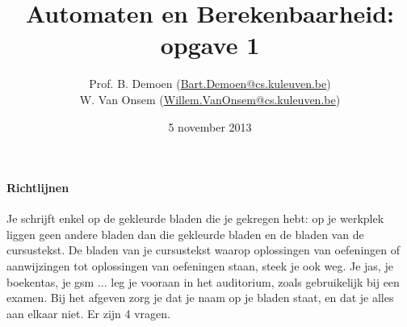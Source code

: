 \documentclass{article}
\title{Automaten en Berekenbaarheid:\\opgave 1}
\author{Prof. B. Demoen (\url{Bart.Demoen@cs.kuleuven.be})\\ W. Van Onsem (\url{Willem.VanOnsem@cs.kuleuven.be})}
\date{5 november 2013}
\begin{document}
\maketitle
\paragraph{Richtlijnen}

Je schrijft enkel op de gekleurde bladen die je gekregen hebt: op je
werkplek liggen geen andere bladen dan die gekleurde bladen en de
bladen van de cursustekst. De bladen van je cursustekst waarop
oplossingen van oefeningen of aanwijzingen tot oplossingen van
oefeningen staan, steek je ook weg. Je jas, je boekentas, je gsm
... leg je vooraan in het auditorium, zoals gebruikelijk bij een
examen. Bij het afgeven zorg je dat je naam op je bladen staat, en dat
je alles aan elkaar niet. Er zijn 4 vragen.
\end{document}
